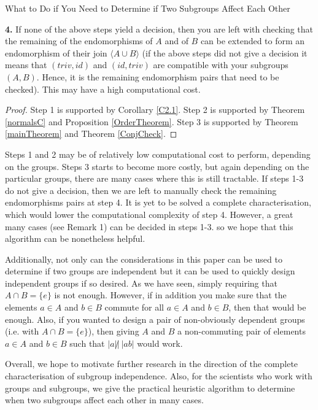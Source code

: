 \documentclass{article}
\begin{document}
\begin{section}{What to Do if You Need to Determine if Two Subgroups Affect Each Other}
		
		\textbf{4.} If none of the above steps yield a decision, then you are left with checking that the remaining of the endomorphisms of $A$ and of $B$ can be extended to form an endomorphism of their join $\langle A \cup B\rangle $ (if the above steps did not give a decision it means that $(triv, id)$ and $(id, triv)$  are compatible with your subgroups $(A, B)$. Hence, it is the remaining endomorphism pairs that need to be checked). This may have a high computational cost.\\
		
		\begin{proof}
			
			Step 1 is supported by Corollary \ref{C2.1}. Step 2 is supported by Theorem \ref{normalsC} and Proposition \ref{OrderTheorem}. Step 3 is supported by Theorem \ref{mainTheorem} and Theorem \ref{ConjCheck}.
		\end{proof} 
		
		
		
		Steps 1 and 2 may be of relatively low computational cost to perform, depending on the groups. Steps 3 starts to become more costly, but again depending on the particular groups, there are many cases where this is still tractable. If steps 1-3 do not give a decision, then we are left to manually  check the remaining endomorphisms pairs at step 4. It is yet to be solved a complete characterisation, which would lower the computational complexity of step 4.  However, a great many cases (see Remark 1) can be decided in steps 1-3. so we hope that this algorithm can be nonetheless helpful. 
		
		Additionally, not only can the considerations in this paper can be used to determine if two groups are independent but it can be used to quickly design independent groups if so desired. As we have seen, simply requiring that $A \cap B =\{e\} $ is not enough. However, if in addition you make sure that the elements $a \in A$ and $b \in B$ commute for all $ a\in A$ and $b \in B$, then that would be enough. Also, if you wanted to design a pair of non-obviously dependent groups (i.e. with $A \cap B = \{e\}$), then giving $A$ and $B$ a non-commuting pair of elements $a \in A$ and $b \in B$ such that $|a| \not| \ |ab|$ would work.
		
		Overall, we hope to motivate further research in the direction of the complete characterisation of subgroup independence. 
		Also, for the scientists who work with groups and subgroups, we give the practical heuristic algorithm to determine when two subgroups affect each other in many cases.
		
	\end{section}
	
\end{document}
